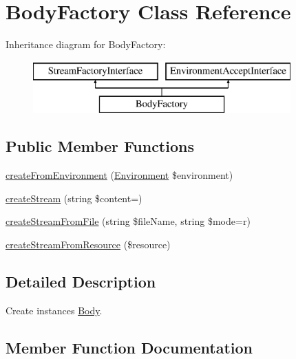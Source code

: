 \hypertarget{class_pes_1_1_http_1_1_factory_1_1_body_factory}{}\section{Body\+Factory Class Reference}
\label{class_pes_1_1_http_1_1_factory_1_1_body_factory}
Inheritance diagram for Body\+Factory\+:\begin{figure}[H]
\begin{center}
\leavevmode
\includegraphics[height=2.000000cm]{class_pes_1_1_http_1_1_factory_1_1_body_factory}
\end{center}
\end{figure}
\subsection*{Public Member Functions}
\begin{DoxyCompactItemize}
\item 
\mbox{\hyperlink{class_pes_1_1_http_1_1_factory_1_1_body_factory_aabcd9fd040e8ac574247abda286cb59f}{create\+From\+Environment}} (\mbox{\hyperlink{class_pes_1_1_http_1_1_environment}{Environment}} \$environment)
\item 
\mbox{\hyperlink{class_pes_1_1_http_1_1_factory_1_1_body_factory_a96eb3d011c550a6eb1c3702b72f8cc43}{create\+Stream}} (string \$content=\textquotesingle{}\textquotesingle{})
\item 
\mbox{\hyperlink{class_pes_1_1_http_1_1_factory_1_1_body_factory_adacc68c99115420e3c25ad402e58b2cd}{create\+Stream\+From\+File}} (string \$file\+Name, string \$mode=\textquotesingle{}r\textquotesingle{})
\item 
\mbox{\hyperlink{class_pes_1_1_http_1_1_factory_1_1_body_factory_a524feaa282b3114ac29af270c0552ffa}{create\+Stream\+From\+Resource}} (\$resource)
\end{DoxyCompactItemize}


\subsection{Detailed Description}
Create instances \mbox{\hyperlink{class_pes_1_1_http_1_1_body}{Body}}. 

\subsection{Member Function Documentation}
\mbox{\label{class_pes_1_1_http_1_1_factory_1_1_body_factory_aabcd9fd040e8ac574247abda286cb59f}} 
